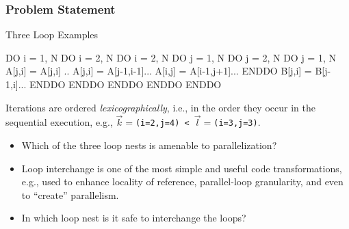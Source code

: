 \documentclass{beamer}
\newcommand{\emp}[1]{\textcolor{DikuRed}{ #1}}
\begin{document}
\begin{frame}[fragile,t]
  \frametitle{Problem Statement} %

\begin{block}{Three Loop Examples}
\begin{colorcode}
DO i = 1, N             DO i = 2, N                 DO i = 2, N
  DO j = 1, N             DO j = 2, N                 DO j = 1, N 
    A[j,i] = A[j,i] ..      A[j,i] = A[j-1,i-1]...        A[i,j] = A[i-1,j+1]...
  ENDDO                     B[j,i] = B[j-1,i]...      ENDDO
ENDDO                   ENDDO ENDDO                 ENDDO
\end{colorcode}
\end{block} 

Iterations are ordered {\em lexicographically}, i.e., in the order
they occur in the sequential execution, e.g., 
{\tt$\vec{k}=$(i=2,j=4) < $\vec{l}=$(i=3,j=3)}.

\bigskip

\begin{itemize}
    \item \emp{Which of the three loop nests is amenable to parallelization?}\smallskip
    \item Loop interchange is one of the most simple and useful code transformations,
            e.g., used to enhance locality of reference, parallel-loop granularity,
            and even to ``create'' parallelism.\smallskip
    \item \emp{In which loop nest is it safe to interchange the loops?}
\end{itemize}


\end{frame}
\end{document}
